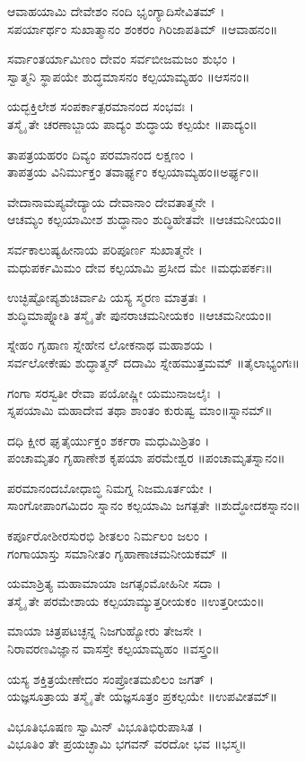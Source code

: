 ಆವಾಹಯಾಮಿ ದೇವೇಶಂ ನಂದಿ ಭೃಂಗ್ಯಾದಿಸೇವಿತಮ್ ।\\
ಸಪರ್ಯಾರ್ಥಂ ಸುಖಾತ್ಮಾನಂ ಶಂಕರಂ ಗಿರಿಜಾಪತಿಮ್ ॥ಆವಾಹನಂ॥

ಸರ್ವಾಂತರ್ಯಾಮಿಣಂ ದೇವಂ ಸರ್ವಬೀಜಮಜಂ ಶುಭಂ ।\\
ಸ್ವಾತ್ಮನಿ ಸ್ಥಾಪಯೇ ಶುದ್ಧಮಾಸನಂ ಕಲ್ಪಯಾಮ್ಯಹಂ ॥ಆಸನಂ॥

ಯದ್ಭಕ್ತಿಲೇಶ ಸಂಪರ್ಕಾತ್ಪರಮಾನಂದ ಸಂಭವಃ ।\\
ತಸ್ಮೈ ತೇ ಚರಣಾಬ್ಜಾಯ ಪಾದ್ಯಂ ಶುದ್ಧಾಯ ಕಲ್ಪಯೇ ॥ಪಾದ್ಯಂ॥

ತಾಪತ್ರಯಹರಂ ದಿವ್ಯಂ ಪರಮಾನಂದ ಲಕ್ಷಣಂ ।\\
ತಾಪತ್ರಯ ವಿನಿರ್ಮುಕ್ತಂ ತವಾರ್ಘ್ಯಂ ಕಲ್ಪಯಾಮ್ಯಹಂ॥ಅರ್ಘ್ಯಂ॥

ವೇದಾನಾಮಪ್ಯವೇದ್ಯಾಯ ದೇವಾನಾಂ ದೇವತಾತ್ಮನೇ ।\\
ಆಚಮ್ಯಂ ಕಲ್ಪಯಾಮೀಶ ಶುದ್ಧಾನಾಂ ಶುದ್ಧಿಹೇತವೇ ॥ಆಚಮನೀಯಂ॥

ಸರ್ವಕಾಲುಷ್ಯಹೀನಾಯ ಪರಿಪೂರ್ಣ ಸುಖಾತ್ಮನೇ ।\\
ಮಧುಪರ್ಕಮಿಮಂ ದೇವ ಕಲ್ಪಯಾಮಿ ಪ್ರಸೀದ ಮೇ ॥ಮಧುಪರ್ಕಃ॥

ಉಚ್ಛಿಷ್ಟೋಪ್ಯಶುಚಿರ್ವಾಪಿ ಯಸ್ಯ ಸ್ಮರಣ ಮಾತ್ರತಃ ।\\
ಶುದ್ಧಿಮಾಪ್ನೋತಿ ತಸ್ಮೈ ತೇ ಪುನರಾಚಮನೀಯಕಂ  ॥ಆಚಮನೀಯಂ॥

ಸ್ನೇಹಂ ಗೃಹಾಣ ಸ್ನೇಹೇನ ಲೋಕನಾಥ ಮಹಾಶಯ ।\\
ಸರ್ವಲೋಕೇಷು ಶುದ್ಧಾತ್ಮನ್ ದದಾಮಿ ಸ್ನೇಹಮುತ್ತಮಮ್ ॥ತೈಲಾಭ್ಯಂಗಃ॥

ಗಂಗಾ ಸರಸ್ವತೀ ರೇವಾ ಪಯೋಷ್ಣೀ ಯಮುನಾಜಲೈಃ~।\\
ಸ್ನಪಯಾಮಿ ಮಹಾದೇವ ತಥಾ ಶಾಂತಂ ಕುರುಷ್ವ ಮಾಂ॥ಸ್ನಾನಮ್॥

ದಧಿ ಕ್ಷೀರ ಘೃತೈರ್ಯುಕ್ತಂ ಶರ್ಕರಾ ಮಧುಮಿಶ್ರಿತಂ ।\\
ಪಂಚಾಮೃತಂ ಗೃಹಾಣೇಶ ಕೃಪಯಾ ಪರಮೇಶ್ವರ  ॥ಪಂಚಾಮೃತಸ್ನಾನಂ॥

ಪರಮಾನಂದಬೋಧಾಬ್ಧಿ ನಿಮಗ್ನ ನಿಜಮೂರ್ತಯೇ ।\\
ಸಾಂಗೋಪಾಂಗಮಿದಂ ಸ್ನಾನಂ ಕಲ್ಪಯಾಮಿ ಜಗತ್ಪತೇ ॥ಶುದ್ಧೋದಕಸ್ನಾನಂ॥

ಕರ್ಪೂರೋಶೀರಸುರಭಿ ಶೀತಲಂ ನಿರ್ಮಲಂ ಜಲಂ ।\\
ಗಂಗಾಯಾಸ್ತು ಸಮಾನೀತಂ ಗೃಹಾಣಾಚಮನೀಯಕಮ್ ॥

ಯಮಾಶ್ರಿತ್ಯ ಮಹಾಮಾಯಾ ಜಗತ್ಸಂಮೋಹಿನೀ ಸದಾ ।\\
ತಸ್ಮೈ ತೇ ಪರಮೇಶಾಯ ಕಲ್ಪಯಾಮ್ಯುತ್ತರೀಯಕಂ ॥ಉತ್ತರೀಯಂ॥

ಮಾಯಾ ಚಿತ್ರಪಟಚ್ಛನ್ನ ನಿಜಗುಹ್ಯೋರು ತೇಜಸೇ ।\\
ನಿರಾವರಣವಿಜ್ಞಾನ ವಾಸಸ್ತೇ ಕಲ್ಪಯಾಮ್ಯಹಂ ॥ವಸ್ತ್ರಂ॥

ಯಸ್ಯ ಶಕ್ತಿತ್ರಯೇಣೇದಂ ಸಂಪ್ರೋತಮಖಿಲಂ ಜಗತ್ ।\\
ಯಜ್ಞಸೂತ್ರಾಯ ತಸ್ಮೈ ತೇ ಯಜ್ಞಸೂತ್ರಂ ಪ್ರಕಲ್ಪಯೇ ॥ಉಪವೀತಮ್॥

ವಿಭೂತಿಭೂಷಣ ಸ್ವಾಮಿನ್ ವಿಭೂತಿಭಿರುಪಾಸಿತ ।\\
ವಿಭೂತಿಂ ತೇ ಪ್ರಯಚ್ಛಾಮಿ ಭಗವನ್ ವರದೋ ಭವ ॥ಭಸ್ಮ॥


